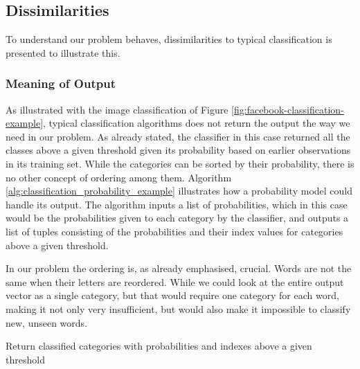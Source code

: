 \subsection{Dissimilarities}
\label{sec:problem_dissimilarities}
To understand our problem behaves, dissimilarities to typical classification is presented to illustrate this.

\subsubsection{Meaning of Output}
\label{sec:meaning_of_output}
As illustrated with the image classification of Figure \ref{fig:facebook-classification-example}, typical classification algorithms does not return the output the way we need in our problem. As already stated, the classifier in this case returned all the classes above a given threshold given its probability based on earlier observations in its training set. While the categories can be sorted by their probability, there is no other concept of ordering among them. Algorithm \ref{alg:classification_probability_example} illustrates how a probability model could handle its output. The algorithm inputs a list of probabilities, which in this case would be the probabilities given to each category by the classifier, and outputs a list of tuples consisting of the probabilities and their index values for categories above a given threshold.

In our problem the ordering is, as already emphasised, crucial. Words are not the same when their letters are reordered. While we could look at the entire output vector as a single category, but that would require one category for each word, making it not only very insufficient, but would also make it impossible to classify new, unseen words.

\begin{algorithm}
    \caption{Return classified categories with probabilities and indexes above a given threshold
        \label{alg:classification_probability_example}}
    \begin{algorithmic}[1]
        \Statex
             
                     
                \EndIf
            \EndFor
        \State {}
        \EndFunction
    \end{algorithmic}
\end{algorithm}

